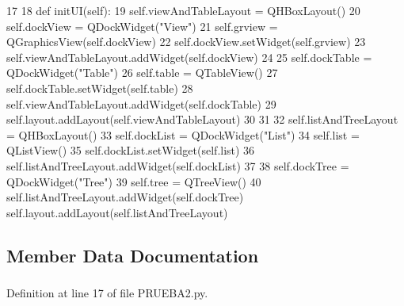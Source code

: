 \begin{DoxyCode}
17 
18     def initUI(self):
19         self.viewAndTableLayout = QHBoxLayout()
20         self.dockView = QDockWidget("View")
21         self.grview = QGraphicsView(self.dockView)
22         self.dockView.setWidget(self.grview)
23         self.viewAndTableLayout.addWidget(self.dockView)
24  
25         self.dockTable = QDockWidget("Table")
26         self.table = QTableView()
27         self.dockTable.setWidget(self.table)
28         self.viewAndTableLayout.addWidget(self.dockTable)
29         self.layout.addLayout(self.viewAndTableLayout)
30  
31  
32         self.listAndTreeLayout = QHBoxLayout()
33         self.dockList = QDockWidget("List")
34         self.list = QListView()
35         self.dockList.setWidget(self.list)
36         self.listAndTreeLayout.addWidget(self.dockList)
37  
38         self.dockTree = QDockWidget("Tree")
39         self.tree = QTreeView()
40         self.listAndTreeLayout.addWidget(self.dockTree)
        self.layout.addLayout(self.listAndTreeLayout)
\end{DoxyCode}


\subsection{\-Member \-Data \-Documentation}
\subsubsection[{dock\-List}]{}\label{classpruebas_1_1_p_r_u_e_b_a2_1_1_example_aa105805e3a1fa5b65667547372fcaae3}


\-Definition at line 17 of file \-P\-R\-U\-E\-B\-A2.\-py.

\subsubsection[{dock\-Table}]{}\label{classpruebas_1_1_p_r_u_e_b_a2_1_1_example_a75e7df632ddd95619832dec0d9e1ca69}


